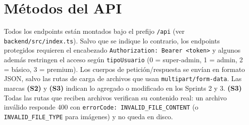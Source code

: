 \chapter{Métodos del API}
Todos los endpoints están montados bajo el prefijo \texttt{/api} (ver \texttt{backend/src/index.ts}). Salvo que se indique lo contrario, los endpoints protegidos requieren el encabezado \texttt{Authorization: Bearer <token>} y algunos además restringen el acceso según \texttt{tipoUsuario} (0 = super-admin, 1 = admin, 2 = básico, 3 = premium). Los cuerpos de petición/respuesta se envían en formato JSON, salvo las rutas de carga de archivos que usan \texttt{multipart/form-data}. Las marcas \textbf{(S2)} y \textbf{(S3)} indican lo agregado o modificado en los Sprints 2 y 3. \textbf{(S3)} Todas las rutas que reciben archivos verifican su contenido real: un archivo inválido responde 400 con \texttt{errorCode: INVALID\_FILE\_CONTENT} (o \texttt{INVALID\_FILE\_TYPE} para imágenes) y no queda en disco.

